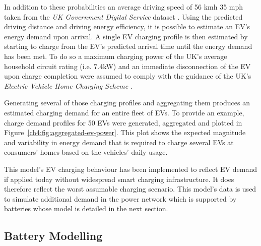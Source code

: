 


 
In addition to these probabilities an average driving speed of 56 kmh \hlrem{(} 35 mph taken from the \textit{UK Government Digital Service} dataset \cite{UKGovernmentDigitalService2013}\cite{BMW_press_i3}.
Using the predicted driving distance and driving energy efficiency, it is possible to estimate an EV's energy demand upon arrival.
A single EV charging profile is then estimated by starting to charge from the EV's predicted arrival time until the energy demand has been met.
To do so a maximum charging power of the UK's average household circuit rating (i.e. 7.4kW) and an immediate disconnection of the EV upon charge completion were assumed to comply with the guidance of the UK's \textit{Electric Vehicle Home Charging Scheme} \cite{EVHomeCharging}.



Generating several of those charging profiles and aggregating them produces an estimated charging demand for an entire fleet of EVs.
To provide an example, charge demand profiles for 50 EVs were generated, aggregated and plotted in Figure~\ref{ch4:fig:aggregated-ev-power}.
This plot shows the expected magnitude and variability in energy demand that is required to charge several EVs at consumers' homes based on the vehicles' daily usage.

This model's EV charging behaviour has been implemented to reflect EV demand if applied today without widespread smart charging infrastructure.
It does therefore reflect the worst assumable charging scenario.
This model's data is used to simulate additional demand in the power network which is supported by batteries whose model is detailed in the next section.

\subsection{Battery Modelling}

